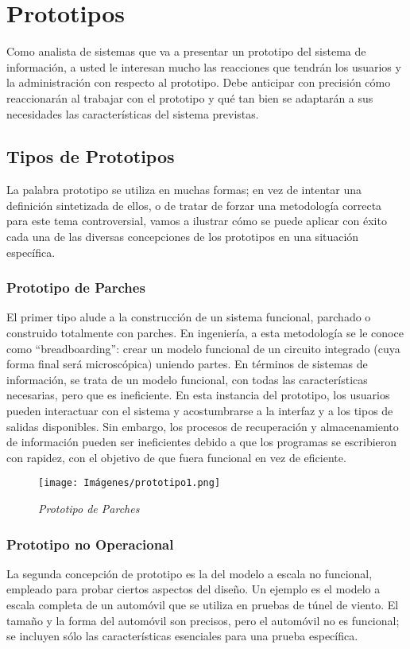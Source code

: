 
\section{Prototipos}
Como analista de sistemas que va a presentar un prototipo del sistema de información, a usted le interesan mucho las reacciones que tendrán los usuarios y la administración con respecto al prototipo. Debe anticipar con precisión cómo reaccionarán al trabajar con el prototipo y qué tan bien se adaptarán a sus necesidades las características del sistema previstas.


\subsection{Tipos de Prototipos}
La palabra prototipo se utiliza en muchas formas; en vez de intentar una definición sintetizada de ellos, o de tratar de forzar una metodología correcta para este tema controversial, vamos a ilustrar cómo se puede aplicar con éxito cada una de las diversas concepciones de los prototipos en una situación específica.

\subsubsection{Prototipo de Parches }
El primer tipo alude a la construcción de un sistema funcional, parchado o construido totalmente con parches. En ingeniería, a esta metodología se le conoce como “breadboarding”: crear un modelo funcional de un circuito integrado (cuya forma final será microscópica) uniendo partes. En términos de sistemas de información, se trata de un modelo funcional, con todas las características necesarias, pero que es ineficiente. En esta instancia del prototipo, los usuarios pueden interactuar con el sistema y acostumbrarse a la interfaz y a los tipos de salidas disponibles. Sin embargo, los procesos de recuperación y almacenamiento de información pueden ser ineficientes debido a que los programas se escribieron con rapidez, con el objetivo de que fuera funcional en vez de eficiente.

\begin{figure}[h!]
    \centering
    \texttt{[image: Imágenes/prototipo1.png]}
    \caption{\textit{Prototipo de Parches}}
    \label{exemploLabel}
    \end{figure}
    
\subsubsection{Prototipo no Operacional }
La segunda concepción de prototipo es la del modelo a escala no funcional, empleado para probar ciertos aspectos del diseño. Un ejemplo es el modelo a escala completa de un automóvil que se utiliza en pruebas de túnel de viento. El tamaño y la forma del automóvil son precisos, pero el automóvil no es funcional; se incluyen sólo las características esenciales para una prueba específica.

